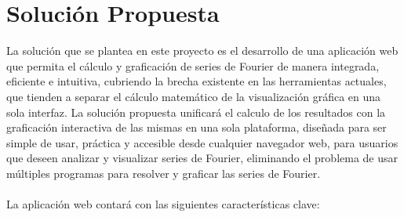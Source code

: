 \section{Solución Propuesta}
La solución que se plantea en este proyecto es el desarrollo de una aplicación web que permita el cálculo y graficación de series de Fourier de manera integrada, eficiente e intuitiva, cubriendo la brecha existente en las herramientas actuales, que tienden a separar el cálculo matemático de la visualización gráfica en una sola interfaz. La solución propuesta unificará el calculo de los resultados con la graficación interactiva de las mismas en una sola plataforma, diseñada para ser simple de usar, práctica y accesible desde cualquier navegador web, para usuarios que deseen analizar y visualizar series de Fourier, eliminando el problema de usar múltiples programas para resolver y graficar las series de Fourier. \\\\
La aplicación web contará con las siguientes características clave:
